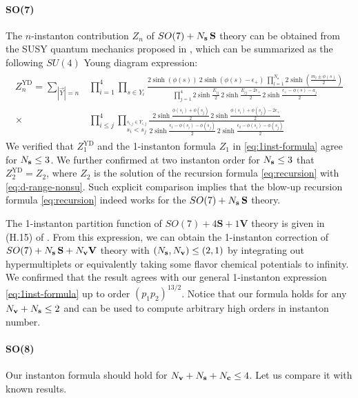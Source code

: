 \documentclass[letterpaper, 11pt]{article}
\def\e{\epsilon}
\begin{document}
{\paragraph{SO(7)} The $n$-instanton contribution $Z_n$ of $SO(7) + N_{\bf s}\,\mathbf{S}$ theory can be obtained from the SUSY quantum mechanics proposed in \cite{Kim:2018gjo}, which can be summarized as the following $SU(4)$ Young diagram expression:
\begin{align}
\begin{split}
  Z_n^\text{YD} = \sum_{|\vec{Y}| = n} &\prod_{i=1}^4\prod_{s \in Y_i}\frac{2\sinh{(\phi(s))} \ 2\sinh{(\phi(s)-\e_+)} \ \prod_{l=1}^{N_\textbf{s}}2\sinh(\frac{m_l \pm \phi(s)}{2}) }{\prod_{j=1}^4 2\sinh{\frac{E_{ij}}{2}}\,2\sinh{\frac{E_{ij}-2\e_+}{2}}\,2\sinh{\frac{\e_+ - \phi(s) - a_j}{2}}} \\ \times &\prod_{i \leq j}^4 \prod_{\stackrel{s_{i,j} \in Y_{i,j}}{s_i < s_j}} \frac{2\sinh{\frac{\phi(s_i)+\phi(s_j)}{2}}\, 2\sinh{\frac{\phi(s_i)+\phi(s_j)-2\e_+}{2}}}{ 2\sinh{\frac{\e_1 - \phi(s_i)-\phi(s_j)}{2}} \, 2\sinh{\frac{\e_2 - \phi(s_i)-\phi(s_j)}{2}}}
\end{split}
\end{align}
We verified that $Z_1^\text{YD}$ and the 1-instanton formula $Z_1$ in \eqref{eq:1inst-formula} agree for $N_{\bf s} \leq 3$. We further confirmed at two instanton order for $N_{\bf s} \leq 3$ that $Z_2^\text{YD} = Z_2$, where $Z_2$ is  the solution of the recursion formula \eqref{eq:recursion} with \eqref{eq:d-range-nonsu}. Such explicit comparison implies that the blow-up recursion formula \eqref{eq:recursion} indeed works for the $SO(7) + N_{\bf s}\,\mathbf{S}$ theory. 

The 1-instanton partition function of $SO(7) + 4\mathbf{S} + 1\mathbf{V}$ theory is given in (H.15) of \cite{DelZotto:2018tcj}.
From this expression, we can obtain the 1-instanton correction of $SO(7) + N_{\bf s}\,\mathbf{S} + N_{\bf v}\mathbf{V}$ theory with $( N_{\bf s}, N_{\bf v}) \leq ( 2,1)$ by integrating out hypermultiplets or equivalently taking some flavor chemical potentials to infinity. We confirmed that the result agrees with our general 1-instanton expression \eqref{eq:1inst-formula} up to order $(p_1p_2)^{13/2}$. Notice that our formula holds for any $N_{\bf v} + N_{\bf s} \le 2$ and can be used to compute arbitrary high orders in instanton number. 

\paragraph{SO(8)}
Our instanton formula should hold for $N_{\bf v} + N_{\bf s} + N_{\bf c} \le 4$. Let us compare it with known results. 

}
\end{document}
